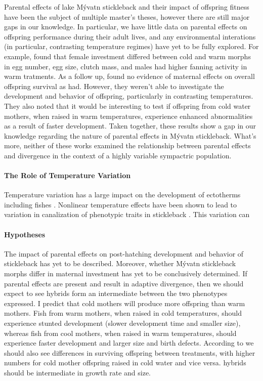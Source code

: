 \documentclass[12pt]{extarticle}
\begin{document}
Parental effects of lake M\'yvatn stickleback and their impact of offspring fitness have been the subject of multiple master's theses, however there are still major gaps in our knowledge. In particular, we have little data on parental effects on offspring performance during their adult lives, and any environmental interations (in particular, contrasting temperature regimes) have yet to be fully explored. For example, \citet{Senn} found that female investment differed between cold and warm morphs in egg number, egg size, clutch mass, and males had higher fanning activity in warm tratments. As a follow up, \citet{Diethelm} found no evidence of maternal effects on overall offspring survival as \citet{Senn} had. However, they weren't able to investigate the development and behavior of offspring, particularly in contrasting temperatures. They also noted that it would be interesting to test if offspring from cold water mothers, when raised in warm temperatures, experience enhanced abnormalities as a result of faster development. Taken together, these results show a gap in our knowledge regarding the nature of parental effects in M\'yvatn stickleback. What's more, neither of these works examined the relationship between parental effects and divergence in the context of a highly variable sympactric population.

\paragraph{The Role of Temperature Variation}
Temperature variation has a large impact on the development of ectotherms including fishes \citep{Massey2021}. Nonlinear temperature effects have been shown to lead to variation in canalization of phenotypic traits in stickleback \citep{Ramler2014}. This variation can 

\paragraph{Hypotheses}
The impact of parental effects on post-hatching development and behavior of stickleback has yet to be described. Moreover, whether M\'yvatn stickleback morphs differ in maternal investment has yet to be conclusively determined. 
If parental effects are present and result in adaptive divergence, then we should expect to see hybrids form an intermediate between the two phenotypes expressed. I predict that cold mothers will produce more offspring than warm mothers. Fish from warm mothers, when raised in cold temperatures, should experience stunted development (slower development time and smaller size), whereas fish from cool mothers, when raised in warm temperatures, should experience faster development and larger size and birth defects.
According to \citet{Senn} we should also see differences in surviving offspring between treatments, with higher numbers for cold mother offspring raised in cold water and vice versa. hybrids should be intermediate in growth rate and size.
\end{document}
